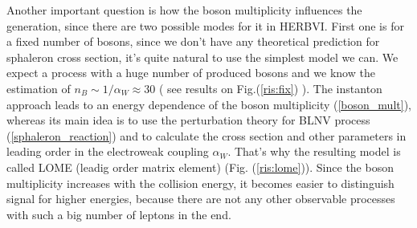 \documentclass[a4paper,12pt]{article}         %
\begin{document}
Another important question is how the boson multiplicity influences the generation, since there are two possible modes for it in HERBVI. First one is for a fixed number of bosons, since we don't have any theoretical prediction for sphaleron cross section, it's quite natural to use the simplest model we can. We expect a process with a huge number of produced bosons and we know the estimation of $n_B \sim 1/\alpha_W \approx 30$ ( see results on Fig.(\ref{ris:fix}) ). The instanton approach leads to an energy dependence of the boson multiplicity (\ref{boson_mult}), whereas its main idea is to use the perturbation theory for BLNV process (\ref{sphaleron_reaction}) and to calculate the cross section and other parameters in leading order in the electroweak coupling $\alpha_W$. That's why the resulting model is called LOME (leadig order matrix element) (Fig. (\ref{ris:lome})). Since the boson multiplicity increases with the collision energy, it becomes easier to distinguish signal for higher energies, because there are not any other observable processes with such a big number of leptons in the end.
\end{document}
